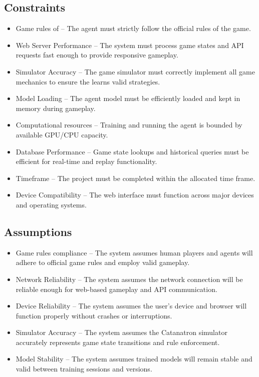 \documentclass{article}
\begin{document}
\subsection{Constraints}\label{subsec:constraints}
\begin{itemize}
    \item {Game rules of \emph{\Catan{}}} – The \RL{} agent must strictly follow the official rules of the game.
    \item {Web Server Performance} – The system must process game states and API requests fast enough to provide responsive gameplay.
    \item {Simulator Accuracy} – The game simulator must correctly implement all game mechanics to ensure the \AI{} learns valid strategies.
    \item {Model Loading} – The \RL{} agent model must be efficiently loaded and kept in memory during gameplay.
    \item {Computational resources} – Training and running the \RL{} agent is bounded by available GPU/CPU capacity.
    \item {Database Performance} – Game state lookups and historical queries must be efficient for real-time and replay functionality.
    \item {Timeframe} – The project must be completed within the allocated time frame.
    \item {Device Compatibility} – The web interface must function across major devices and operating systems.
\end{itemize}

\subsection{Assumptions}\label{subsec:assumptions}
\begin{itemize}
    \item {Game rules compliance} – The system assumes human players and \AI{} agents will adhere to official game rules and employ valid gameplay.
    \item {Network Reliability} – The system assumes the network connection will be reliable enough for web-based gameplay and API communication.
    \item {Device Reliability} – The system assumes the user's device and browser will function properly without crashes or interruptions.
    \item {Simulator Accuracy} – The system assumes the Catanatron simulator accurately represents game state transitions and rule enforcement.
    \item {Model Stability} – The system assumes trained \RL{} models will remain stable and valid between training sessions and versions.
\end{itemize}
\end{document}
